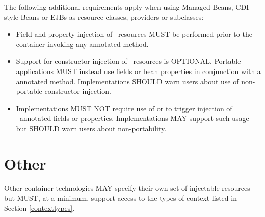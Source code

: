 The following additional requirements apply when using Managed Beans, CDI-style Beans or EJBs as resource classes, providers or  subclasses:

\begin{itemize}
\item Field and property injection of \jaxrs\ resources MUST be performed prior to the container invoking any  annotated method.
\item Support for constructor injection of \jaxrs\ resources is OPTIONAL. Portable applications MUST instead use fields or bean properties in conjunction with a  annotated method. Implementations SHOULD warn users about use of non-portable constructor injection.
\item Implementations MUST NOT require use of  or  to trigger injection of \jaxrs\ annotated fields or properties. Implementations MAY support such usage but SHOULD warn users about non-portability.
\end{itemize}

\section{Other}

Other container technologies MAY specify their own set of injectable resources but MUST, at a minimum, support access to the types of context listed in Section \ref{contexttypes}.

